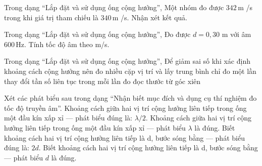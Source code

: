 \begin{ex}
Trong dạng “Lắp đặt và sử dụng ống cộng hưởng”, Một nhóm đo được $342\,\text{m}$ /s trong khi giá trị tham chiếu là $340\,\text{m}$ /s. Nhận xét kết quả.
\choiceTF

\end{ex}

\begin{ex}
Trong dạng “Lắp đặt và sử dụng ống cộng hưởng”, Đo được $d=0,30$ m với âm $600\,\text{Hz}$. Tính tốc độ âm theo m/s.
\end{ex}

\begin{ex}
Trong dạng “Lắp đặt và sử dụng ống cộng hưởng”, Để giảm sai số khi xác định khoảng cách cộng hưởng nên
\choice
{\True đo nhiều cặp vị trí và lấy trung bình}
{chỉ đo một lần}
{thay đổi tần số liên tục trong mỗi lần đo}
{đọc thước từ góc xiên}
\end{ex}

\begin{ex}
Xét các phát biểu sau trong dạng “Nhận biết mục đích và dụng cụ thí nghiệm đo tốc độ truyền âm”.
\choiceTF
{\True Khoảng cách giữa hai vị trí cộng hưởng liên tiếp trong ống một đầu kín xấp xỉ — phát biểu đúng là: $\lambda/2$.}
{Khoảng cách giữa hai vị trí cộng hưởng liên tiếp trong ống một đầu kín xấp xỉ — phát biểu $\lambda$ là đúng.}
{\True Biết khoảng cách hai vị trí cộng hưởng liên tiếp là d, bước sóng bằng — phát biểu đúng là: $2d$.}
{Biết khoảng cách hai vị trí cộng hưởng liên tiếp là d, bước sóng bằng — phát biểu $d$ là đúng.}
\end{ex}

